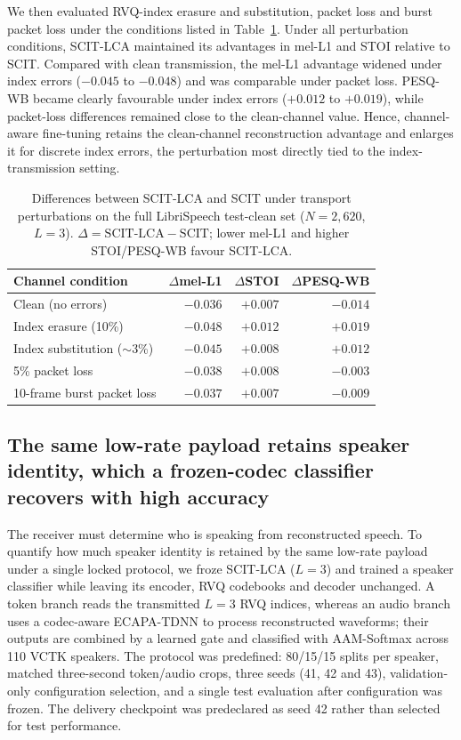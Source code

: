 \documentclass[final,5p,times,twocolumn]{elsarticle}
\begin{document}
We then evaluated RVQ-index erasure and substitution, packet loss and burst packet loss under the conditions listed in Table~\ref{tab:robustness}. Under all perturbation conditions, SCIT-LCA maintained its advantages in mel-L1 and STOI relative to SCIT. Compared with clean transmission, the mel-L1 advantage widened under index errors ($-0.045$ to $-0.048$) and was comparable under packet loss. PESQ-WB became clearly favourable under index errors ($+0.012$ to $+0.019$), while packet-loss differences remained close to the clean-channel value. Hence, channel-aware fine-tuning retains the clean-channel reconstruction advantage and enlarges it for discrete index errors, the perturbation most directly tied to the index-transmission setting.

\begin{table}[t]
\centering
\caption{Differences between SCIT-LCA and SCIT under transport perturbations on the full LibriSpeech test-clean set ($N=2{,}620$, $L=3$). $\Delta=\mathrm{SCIT\text{-}LCA}-\mathrm{SCIT}$; lower mel-L1 and higher STOI/PESQ-WB favour SCIT-LCA.}
\label{tab:robustness}
\small\setlength{\tabcolsep}{4pt}
\begin{tabular}{lrrr}
\toprule
Channel condition & $\Delta$mel-L1 & $\Delta$STOI & $\Delta$PESQ-WB\\
\midrule
Clean (no errors) & $-0.036$ & $+0.007$ & $-0.014$\\
Index erasure (10\%) & $-0.048$ & $+0.012$ & $+0.019$\\
Index substitution ($\sim$3\%) & $-0.045$ & $+0.008$ & $+0.012$\\
5\% packet loss & $-0.038$ & $+0.008$ & $-0.003$\\
10-frame burst packet loss & $-0.037$ & $+0.007$ & $-0.009$\\
\bottomrule
\end{tabular}
\end{table}

\subsection{The same low-rate payload retains speaker identity, which a frozen-codec classifier recovers with high accuracy}
The receiver must determine who is speaking from reconstructed speech. To quantify how much speaker identity is retained by the same low-rate payload under a single locked protocol, we froze SCIT-LCA ($L=3$) and trained a speaker classifier while leaving its encoder, RVQ codebooks and decoder unchanged. A token branch reads the transmitted $L=3$ RVQ indices, whereas an audio branch uses a codec-aware ECAPA-TDNN to process reconstructed waveforms; their outputs are combined by a learned gate and classified with AAM-Softmax across 110 VCTK speakers. The protocol was predefined: 80/15/15 splits per speaker, matched three-second token/audio crops, three seeds (41, 42 and 43), validation-only configuration selection, and a single test evaluation after configuration was frozen. The delivery checkpoint was predeclared as seed 42 rather than selected for test performance.
\end{document}
